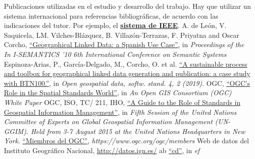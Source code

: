 \begin{thebibliography}{99}
     Publicaciones utilizadas en el estudio y desarrollo del trabajo.
        Hay que utilizar un sistema internacional para referencias bibliográficas, de acuerdo con las indicaciones del tutor. Por ejemplo, el \href{https://www.etsiinf.upm.es/docs/estudios/grado/1475_ieeecitationref.pdf}{\textbf{sistema de IEEE}}.
    A. de Le{\'o}n, V. Saquicela, LM. Vilches-Bl{\'a}zquez, B. Villaz{\'o}n-Terrazas, F. Priyatna and Oscar Corcho,
        \href{http://oa.upm.es/6167/}{``Geographical Linked Data: a Spanish Use Case'',}
        in \textit{Proceedings of the In I-SEMANTICS '10  6th International Conference on Semantic Systems}
    Espinoza-Arias, P., García-Delgado, M., Corcho, O. et al.
        \href{https://doi.org/10.1186/s40965-019-0060-4}{``A sustainable process and toolbox for geographical linked data generation and publication: a case study with BTN100.''},
        in \textit{Open geospatial data, softw. stand. 4, 2 (2019).}
     OGC,
        \href{portal.opengeospatial.org/files/?artifact_id=6207&ei=haJwVY7ZOcfusAXb4oK4DA&usg=AFQjCNEKzXyIOXuYNii4cRrwGU6wfD4BgQ&sig2=41F6mU19BEdW_td2wCIrIQ&bvm=bv.94911696,d.b2w}{``OGC’s Role in the Spatial Standards World''},
        in \textit{An Open GIS Consortium (OGC) White Paper}
    OGC, ISO, TC/ 211, IHO,
        \href{http://ggim.un.org/meetings/GGIM-committee/8th-Session/documents/Standards_Guide_2018.pdf}{``A Guide to the Role of Standards in Geospatial Information Management''},
        in \textit{Fifth Session of the United Nations Committee of Experts on Global Geospatial Information Management (UN-GGIM). Held from 3-7 August 2015 at the United Nations Headquarters in New York.}
        \href{https://www.ogc.org/ogc/members}{``Miembros del OGC''},
        \textit{https://www.ogc.org/ogc/members}
     Web de datos del Instituto Geográfico Nacional,
        \href{http://datos.ign.es/}{http://datos.ign.es/}
    ab
        \href{}{``cd''},
        in \textit{ef}



\end{thebibliography}
